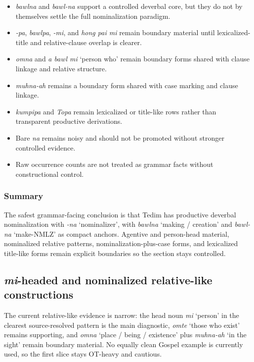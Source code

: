 \documentclass[
  11pt,
  a4paper,
]{article}
\providecommand{\tightlist}{%
  \setlength{\itemsep}{0pt}\setlength{\parskip}{0pt}}
\newcommand{\tdim}[1]{\textit{#1}}
\newcommand{\glossquote}[1]{`#1'}
\begin{document}
\begin{itemize}
\tightlist
\item
  \tdim{bawlna} and \tdim{bawl-na} support a controlled deverbal core,
  but they do not by themselves settle the full nominalization paradigm.
\item
  \tdim{-pa}, \tdim{bawlpa}, \tdim{-mi}, and \tdim{hong pai mi} remain
  boundary material until lexicalized-title and relative-clause overlap
  is clearer.
\item
  \tdim{omna} and \tdim{a bawl mi} \glossquote{person who} remain
  boundary forms shared with clause linkage and relative structure.
\item
  \tdim{muhna-ah} remains a boundary form shared with case marking and
  clause linkage.
\item
  \tdim{kumpipa} and \tdim{Topa} remain lexicalized or title-like rows
  rather than transparent productive derivations.
\item
  Bare \tdim{na} remains noisy and should not be promoted without
  stronger controlled evidence.
\item
  Raw occurrence counts are not treated as grammar facts without
  constructional control.
\end{itemize}

\subsubsection{Summary}\label{summary-9}

The safest grammar-facing conclusion is that Tedim has productive
deverbal nominalization with \tdim{-na} \glossquote{nominalizer}, with
\tdim{bawlna} \glossquote{making / creation} and \tdim{bawl-na}
\glossquote{make-NMLZ} as compact anchors. Agentive and person-head
material, nominalized relative patterns, nominalization-plus-case forms,
and lexicalized title-like forms remain explicit boundaries so the
section stays controlled.

\subsection{\texorpdfstring{\tdim{mi}-headed and nominalized
relative-like
constructions}{-headed and nominalized relative-like constructions}}\label{headed-and-nominalized-relative-like-constructions}

The current relative-like evidence is narrow: the head noun \tdim{mi}
\glossquote{person} in the clearest source-resolved pattern is the main
diagnostic, \tdim{omte} \glossquote{those who exist} remains supporting,
and \tdim{omna} \glossquote{place / being / existence} plus
\tdim{muhna-ah} \glossquote{in the sight} remain boundary material. No
equally clean Gospel example is currently used, so the first slice stays
OT-heavy and cautious.
\end{document}
